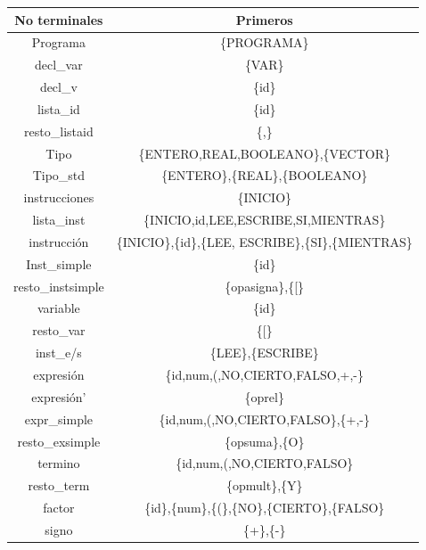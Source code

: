 \documentclass[11pt]{article}
\begin{document}
\begin{tabular}{|c|c|}
	\hline
	\textbf{No terminales} & \textbf{Primeros} \\ \hline
	Programa & \{PROGRAMA\} \\ \hline
	decl\_var & \{VAR\} \\ \hline
	decl\_v & \{id\} \\ \hline
	lista\_id & \{id\} \\ \hline
	resto\_listaid & \{,\} \\ \hline
	Tipo & \{ENTERO,REAL,BOOLEANO\},\{VECTOR\} \\ \hline
	Tipo\_std & \{ENTERO\},\{REAL\},\{BOOLEANO\} \\ \hline
	instrucciones & \{INICIO\} \\ \hline
	lista\_inst & \{INICIO,id,LEE,ESCRIBE,SI,MIENTRAS\} \\ \hline
	instrucción & \{INICIO\},\{id\},\{LEE, ESCRIBE\},\{SI\},\{MIENTRAS\} \\ \hline
	Inst\_simple & \{id\} \\ \hline
	resto\_instsimple & \{opasigna\},\{[\} \\ \hline
	variable & \{id\} \\ \hline
	resto\_var & \{[\} \\ \hline
	inst\_e/s & \{LEE\},\{ESCRIBE\} \\ \hline
	expresión & \{id,num,(,NO,CIERTO,FALSO,+,-\} \\ \hline
	expresión' & \{oprel\} \\ \hline
	expr\_simple & \{id,num,(,NO,CIERTO,FALSO\},\{+,-\} \\ \hline
	resto\_exsimple & \{opsuma\},\{O\} \\ \hline
	termino & \{id,num,(,NO,CIERTO,FALSO\} \\ \hline
	resto\_term & \{opmult\},\{Y\} \\ \hline
	factor & \{id\},\{num\},\{(\},\{NO\},\{CIERTO\},\{FALSO\} \\ \hline
	signo & \{+\},\{-\} \\ \hline
\end{tabular}
\end{document}
